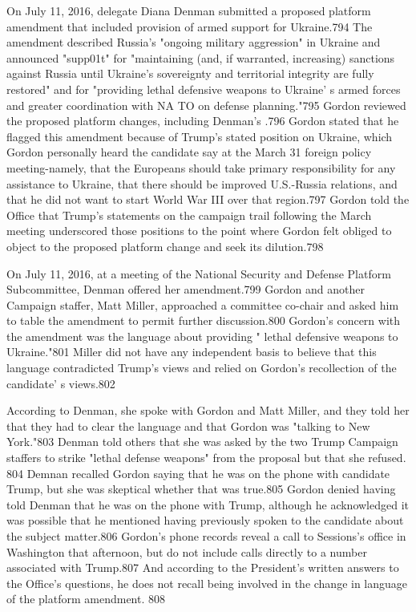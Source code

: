 On July 11, 2016, delegate Diana Denman submitted a proposed platform amendment that included provision of armed support for Ukraine.794 The amendment described Russia's "ongoing military aggression" in Ukraine and announced "supp01t" for "maintaining (and, if warranted, increasing) sanctions against Russia until Ukraine's sovereignty and territorial integrity are fully restored" and for "providing lethal defensive weapons to Ukraine' s  armed forces and greater coordination with NA TO on defense planning."795 Gordon reviewed the proposed platform changes, including Denman's .796 Gordon stated that he flagged this amendment because of Trump's stated position on Ukraine, which Gordon personally heard the candidate say at the March 31 foreign policy meeting-namely, that the Europeans should take primary responsibility for any assistance to Ukraine, that there should be improved U.S.-Russia relations, and that he did not want to start World War III over that region.797 Gordon told the Office that Trump's statements on the campaign trail following the March meeting underscored those positions to the point where Gordon felt obliged to object to the proposed platform change and seek its dilution.798

On July 11,   2016, at a meeting of the National Security and Defense Platform Subcommittee, Denman offered her amendment.799 Gordon and another Campaign staffer, Matt Miller, approached a committee co-chair and asked him to table the amendment to permit further discussion.800 Gordon's concern with the amendment was the language about providing " lethal defensive weapons to Ukraine."801 Miller did not have any independent basis to believe that this language contradicted Trump's views and relied on Gordon's recollection of the candidate' s views.802

According to Denman, she spoke with Gordon and Matt Miller, and they told her that they had to clear the language and that Gordon was "talking to New York."803 Denman told others that she was asked by the two Trump Campaign staffers to strike "lethal defense weapons"  from the proposal but that she refused. 804 Demnan recalled Gordon saying that he was on the phone with candidate Trump, but she was skeptical whether that was true.805 Gordon denied having told Denman that he was on the phone with Trump, although he acknowledged it was possible that he mentioned having previously spoken to the candidate about the subject matter.806 Gordon's phone records reveal a  call to Sessions's office in Washington that afternoon, but do not include calls directly to a number associated with Trump.807 And according to the President's written answers to the Office's questions, he does not recall being involved in the change in language of the platform amendment. 808

